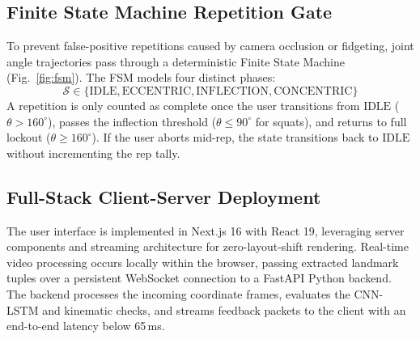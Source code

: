 \documentclass[conference]{IEEEtran}
\begin{document}
\subsection{Finite State Machine Repetition Gate}
To prevent false-positive repetitions caused by camera occlusion or fidgeting, joint angle trajectories pass through a deterministic Finite State Machine (Fig.~\ref{fig:fsm}). The FSM models four distinct phases:
\begin{equation}
    \mathcal{S} \in \{\text{IDLE}, \text{ECCENTRIC}, \text{INFLECTION}, \text{CONCENTRIC}\}
\end{equation}
A repetition is only counted as complete once the user transitions from $\text{IDLE}$ ($\theta > 160^\circ$), passes the inflection threshold ($\theta \le 90^\circ$ for squats), and returns to full lockout ($\theta \ge 160^\circ$). If the user aborts mid-rep, the state transitions back to $\text{IDLE}$ without incrementing the rep tally.

\subsection{Full-Stack Client-Server Deployment}
The user interface is implemented in Next.js 16 with React 19, leveraging server components and streaming architecture for zero-layout-shift rendering. Real-time video processing occurs locally within the browser, passing extracted landmark tuples over a persistent WebSocket connection to a FastAPI Python backend. The backend processes the incoming coordinate frames, evaluates the CNN-LSTM and kinematic checks, and streams feedback packets to the client with an end-to-end latency below 65\,ms.
\end{document}
